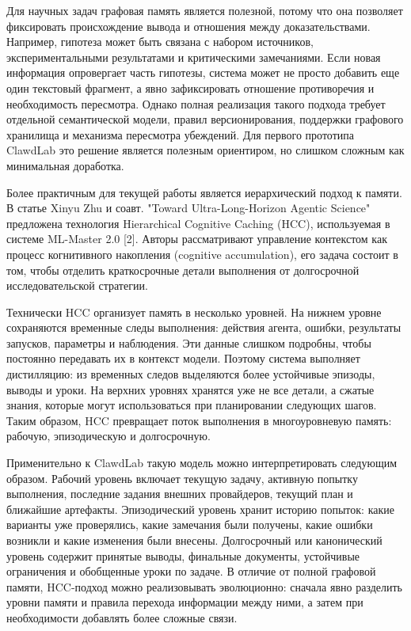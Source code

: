 Для научных задач графовая память является полезной, потому что она позволяет фиксировать происхождение вывода и отношения между доказательствами. Например, гипотеза может быть связана с набором источников, экспериментальными результатами и критическими замечаниями. Если новая информация опровергает часть гипотезы, система может не просто добавить еще один текстовый фрагмент, а явно зафиксировать отношение противоречия и необходимость пересмотра. Однако полная реализация такого подхода требует отдельной семантической модели, правил версионирования, поддержки графового хранилища и механизма пересмотра убеждений. Для первого прототипа ClawdLab это решение является полезным ориентиром, но слишком сложным как минимальная доработка.

Более практичным для текущей работы является иерархический подход к памяти. В статье Xinyu Zhu и соавт. "Toward Ultra-Long-Horizon Agentic Science" предложена технология Hierarchical Cognitive Caching (HCC), используемая в системе ML-Master 2.0 [2]. Авторы рассматривают управление контекстом как процесс когнитивного накопления (cognitive accumulation), его задача состоит в том, чтобы отделить краткосрочные детали выполнения от долгосрочной исследовательской стратегии.

Технически HCC организует память в несколько уровней. На нижнем уровне сохраняются временные следы выполнения: действия агента, ошибки, результаты запусков, параметры и наблюдения. Эти данные слишком подробны, чтобы постоянно передавать их в контекст модели. Поэтому система выполняет дистилляцию: из временных следов выделяются более устойчивые эпизоды, выводы и уроки. На верхних уровнях хранятся уже не все детали, а сжатые знания, которые могут использоваться при планировании следующих шагов. Таким образом, HCC превращает поток выполнения в многоуровневую память: рабочую, эпизодическую и долгосрочную.

Применительно к ClawdLab такую модель можно интерпретировать следующим образом. Рабочий уровень включает текущую задачу, активную попытку выполнения, последние задания внешних провайдеров, текущий план и ближайшие артефакты. Эпизодический уровень хранит историю попыток: какие варианты уже проверялись, какие замечания были получены, какие ошибки возникли и какие изменения были внесены. Долгосрочный или канонический уровень содержит принятые выводы, финальные документы, устойчивые ограничения и обобщенные уроки по задаче. В отличие от полной графовой памяти, HCC-подход можно реализовывать эволюционно: сначала явно разделить уровни памяти и правила перехода информации между ними, а затем при необходимости добавлять более сложные связи.

